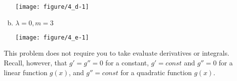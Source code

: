 \documentclass[12pt,fleqn]{article}\usepackage[]{graphicx}\usepackage[]{color}
\newenvironment{knitrout}{}{} %
\theoremstyle{definition}
\begin{document}
\begin{enumerate}[1.]
\begin{enumerate}[(a)]
\begin{knitrout}
{\centering \texttt{[image: figure/4\_d-1]} 

}



\end{knitrout}

          \item $\lambda = 0, m= 3$
\begin{knitrout}
\color{fgcolor}

{\centering \texttt{[image: figure/4\_e-1]} 

}



\end{knitrout}
        \end{enumerate}
    This problem does not require you to take evaluate derivatives or integrals. Recall, however, that $g' = g'' = 0$ for a constant, $g' = const$ and $g'' = 0$ for a linear function $g(x)$, and $g'' = const$ for a quadratic function $g(x)$.
	\end{enumerate}
\end{document}
